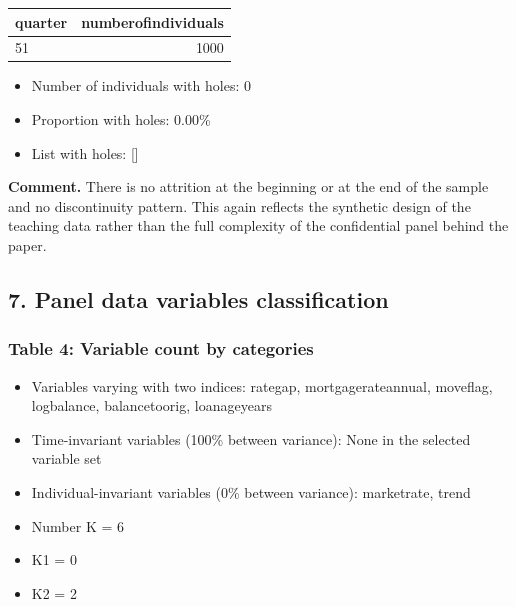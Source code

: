 \documentclass[a4paper,11pt]{article}
\renewcommand{\_}{\textunderscore\allowbreak}
\renewcommand{\arraystretch}{1.25}
\providecommand{\tightlist}{%
  \setlength{\itemsep}{0pt}\setlength{\parskip}{0pt}}
\begin{document}
\begin{center}
\begingroup
\footnotesize
\setlength{\tabcolsep}{4pt}
\renewcommand{\arraystretch}{1.22}
\begin{adjustbox}{max width=\textwidth}
\begin{tabular}{@{}lr@{}}
\toprule
quarter & number\_of\_individuals \\
\midrule
51 & 1000 \\
\bottomrule
\end{tabular}
\end{adjustbox}
\endgroup
\end{center}

\begin{itemize}
\tightlist
\item
  Number of individuals with holes: 0
\item
  Proportion with holes: 0.00\%
\item
  List with holes: {[}{]}
\end{itemize}

\textbf{Comment.} There is no attrition at the beginning or at the end
of the sample and no discontinuity pattern. This again reflects the
synthetic design of the teaching data rather than the full complexity of
the confidential panel behind the paper.

\hypertarget{panel-data-variables-classification}{%
\subsection{7. Panel data variables
classification}\label{panel-data-variables-classification}}

\hypertarget{table-4-variable-count-by-categories}{%
\subsubsection{Table 4: Variable count by
categories}\label{table-4-variable-count-by-categories}}

\begin{itemize}
\tightlist
\item
  Variables varying with two indices: rate\_gap, mortgage\_rate\_annual,
  move\_flag, log\_balance, balance\_to\_orig, loan\_age\_years
\item
  Time-invariant variables (100\% between variance): None in the
  selected variable set
\item
  Individual-invariant variables (0\% between variance): market\_rate,
  trend
\item
  Number K = 6
\item
  K1 = 0
\item
  K2 = 2
\end{itemize}
\end{document}
